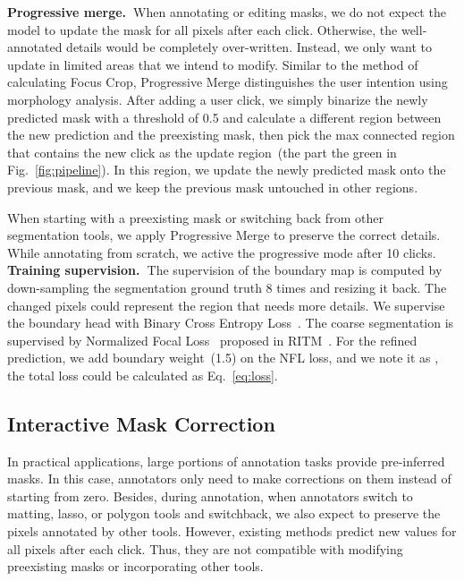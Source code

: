 \documentclass[10pt,twocolumn,letterpaper]{article}
\begin{document}
\noindent \textbf{Progressive merge.~}When annotating or editing masks, we do not expect the model to update the mask for all pixels after each click. Otherwise, the well-annotated details would be completely over-written. Instead, we only want to update in limited areas that we intend to modify.  
Similar to the method of calculating Focus Crop, Progressive Merge distinguishes the user intention using morphology analysis. After adding a user click, we simply binarize the newly predicted mask with a threshold of 0.5 and calculate a different region between the new prediction and the preexisting mask, then pick the max connected region that contains the new click as the update region~(the part the green in Fig.~\ref{fig:pipeline}).  In this region, we update the newly predicted mask onto the previous mask, and we keep the previous mask untouched in other regions.  

When starting with a preexisting mask or switching back from other segmentation tools, we apply Progressive Merge to preserve the correct details. While annotating from scratch, we active the progressive mode after 10 clicks.\\


\noindent \textbf{Training supervision.~}The supervision of the boundary map  is computed by down-sampling the segmentation ground truth 8 times and resizing it back. The changed pixels could represent the region that needs more details. We supervise the boundary head with Binary Cross Entropy Loss~. The coarse segmentation is supervised by Normalized Focal Loss~ proposed in RITM~\cite{sofiiuk2021ritm}. For the refined prediction, we add boundary weight~(1.5) on the NFL loss, and we note it as , the total loss could be calculated as Eq.~\ref{eq:loss}.




\subsection{ Interactive Mask Correction }
\label{sec:mask}
In practical applications, large portions of annotation tasks provide pre-inferred masks. In this case, annotators only need to make corrections on them instead of starting from zero. Besides, during annotation, when annotators switch to matting, lasso, or polygon tools and switchback, we also expect to preserve the pixels annotated by other tools. However, existing methods predict new values for all pixels after each click. Thus, they are not compatible with modifying preexisting masks or incorporating other tools.
\end{document}
